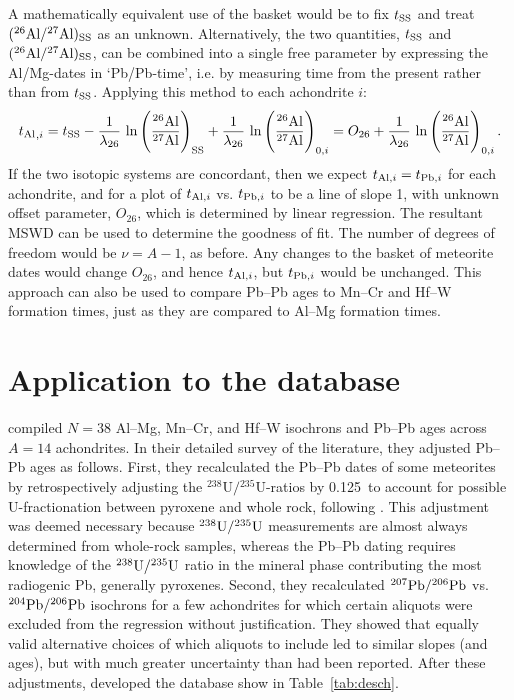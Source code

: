A mathematically equivalent use of the basket would be to fix $t_{\rm
  SS}$ and treat $({}^{26}\mbox{Al}/{}^{27}\mbox{Al})_{\rm SS}$ as an
unknown.  Alternatively, the two quantities, $t_{\rm SS}$ and
$({}^{26}\mbox{Al}/{}^{27}\mbox{Al})_{\rm SS}$, can be combined into a
single free parameter by expressing the Al/Mg-dates in `Pb/Pb-time',
i.e. by measuring time from the present rather than from $t_{\rm SS}$.
Applying this method to each achondrite $i$:
\begin{equation}
\mbox{$t_{\rm Al}$}_{,i} = \mbox{$t_{\rm SS}$} - \frac{1}{\lambda_{26}} \, \ln \left( \frac{
  {}^{26}{\rm Al} }{ {}^{27}{\rm Al} } \right)_{\rm SS} +
\frac{1}{\lambda_{26}} \, \ln \left( \frac{ {}^{26}{\rm Al} }{
  {}^{27}{\rm Al} } \right)_{0,i} = {O}_{26} + \frac{1}{\lambda_{26}}
\, \ln \left( \frac{ {}^{26}{\rm Al} }{ {}^{27}{\rm Al} }
\right)_{0,i}.
  \label{eq:A}
\end{equation}
If the two isotopic systems are concordant, then we expect $t_{{\rm
    Al},i} = t_{{\rm Pb},i}$ for each achondrite, and for a plot of
$t_{{\rm Al},i}$ vs. $t_{{\rm Pb},i}$ to be a line of slope 1, with
unknown offset parameter, ${O}_{26}$, which is determined by linear
regression.  The resultant MSWD can be used to determine the goodness
of fit.  The number of degrees of freedom would be $\nu = A-1$, as
before. Any changes to the basket of meteorite dates would change
${O}_{26}$, and hence $t_{{\rm Al},i}$, but $t_{{\rm Pb},i}$ would be unchanged.  This
approach can also be used to compare Pb--Pb ages to Mn--Cr and Hf--W
formation times, just as they are compared to Al--Mg formation times.

\section{Application to the \citet{desch2023b} database}
\label{sec:application}

\citet{desch2023b} compiled $N = 38$ Al--Mg, Mn--Cr, and Hf--W
isochrons and Pb--Pb ages across $A = 14$ achondrites.  In their
detailed survey of the literature, they adjusted Pb--Pb ages as
follows.  First, they recalculated the Pb--Pb dates of some meteorites
by retrospectively adjusting the
${}^{238}\mbox{U}/{}^{235}\mbox{U}$-ratios by 0.125\textperthousand\ to
account for possible U-fractionation between pyroxene and whole rock,
following \citet{tissot2017}.  This adjustment was deemed necessary
because ${}^{238}{\rm U}/{}^{235}{\rm U}$ measurements are almost
always determined from whole-rock samples, whereas the Pb--Pb dating
requires knowledge of the ${}^{238}{\rm U}/{}^{235}{\rm U}$ ratio in
the mineral phase contributing the most radiogenic Pb, generally
pyroxenes.  Second, they recalculated ${}^{207}{\rm Pb}/{}^{206}{\rm
  Pb}$ vs. ${}^{204}{\rm Pb}/{}^{206}{\rm Pb}$ isochrons for a few
achondrites for which certain aliquots were excluded from the
regression without justification.  They showed that equally valid
alternative choices of which aliquots to include led to similar slopes
(and ages), but with much greater uncertainty than had been reported.
After these adjustments, \citet{desch2023a,desch2023b} developed the
database show in Table~\ref{tab:desch}.

